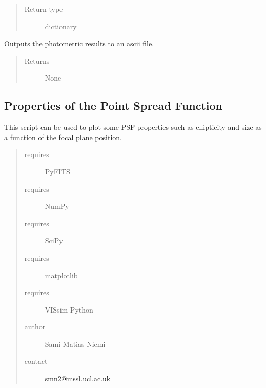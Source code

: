 \documentclass[a4paper,12pt,english]{sphinxmanual}
\begin{document}
\begin{fulllineitems}
\begin{fulllineitems}
\begin{quote}
\begin{description}
\item[{Return type}] \leavevmode
dictionary

\end{description}\end{quote}

\end{fulllineitems}


\begin{fulllineitems}
Outputs the photometric results to an ascii file.
\begin{quote}\begin{description}
\item[{Returns}] \leavevmode
None

\end{description}\end{quote}

\end{fulllineitems}


\end{fulllineitems}

\label{analysis:module-analysis.PSFproperties}

\subsection{Properties of the Point Spread Function}
\label{analysis:properties-of-the-point-spread-function}
This script can be used to plot some PSF properties such as ellipticity and size as a function of the focal plane position.
\begin{quote}\begin{description}
\item[{requires}] \leavevmode
PyFITS

\item[{requires}] \leavevmode
NumPy

\item[{requires}] \leavevmode
SciPy

\item[{requires}] \leavevmode
matplotlib

\item[{requires}] \leavevmode
VISsim-Python

\item[{author}] \leavevmode
Sami-Matias Niemi

\item[{contact}] \leavevmode
\href{mailto:smn2@mssl.ucl.ac.uk}{smn2@mssl.ucl.ac.uk}

\end{description}\end{quote}
\end{document}
